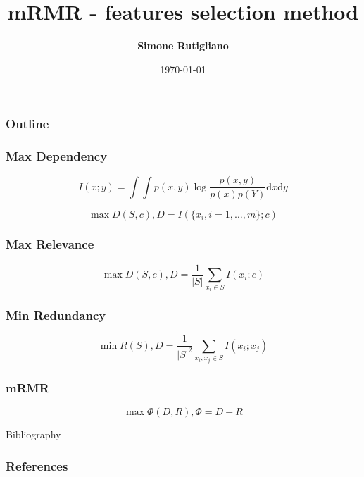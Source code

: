 \documentclass{beamer}
\title[mRMR]{mRMR - features selection method}
\institute{
\begin{small}
Corso di Laurea in Informatica Magistrale
\end{small}}
\author{\textbf{Simone Rutigliano}}
\date{\tiny{\today}}
\begin{document}

\begin{frame}
\maketitle
\end{frame}


\begin{frame}
\frametitle{Outline}
	\tableofcontents
\end{frame}

\begin{frame}
	\frametitle{Max Dependency}
	\nocite{Ding:2003:MRF:937976.938050}
	\nocite{Peng05featureselection}

	$$ I (x;y) = \int \int p(x,y)\log \frac{p(x,y)}{p(x)p(Y)} \mathrm{d}x \mathrm{d}y$$

$$ \max D(S,c), D = I(\{x_i,i=1,\dots,m \};c )$$
\end{frame}
\begin{frame}
	\frametitle{Max Relevance}
	$$\max D(S,c), D= \frac{1}{|S|} \sum_{x_i \in S} I (x_i;c)$$
\end{frame}
\begin{frame}
	\frametitle{Min Redundancy}
	$$\min R(S), D= \frac{1}{|S|^2} \sum_{x_i,x_j \in S} I (x_i;x_j)$$
\end{frame}
\begin{frame}
	\frametitle{mRMR}
	$$\max \Phi(D,R), \Phi = D - R$$
\end{frame}
\begin{frame}{Bibliography}
	\frametitle{References}
	
	
\end{frame}
\end{document}
